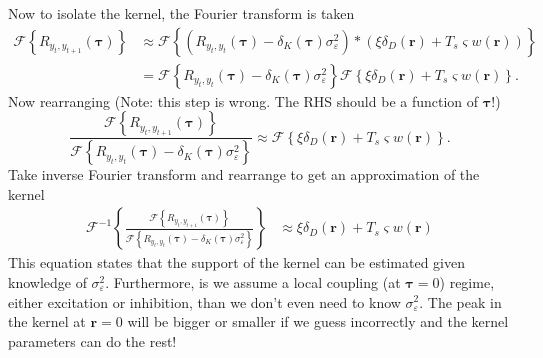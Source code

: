 \documentclass[review,authoryear,3p]{elsarticle}
\begin{document}
Now to isolate the kernel, the Fourier transform is taken
\begin{align}
	\mathcal{F}\left\{R_{y_{t},y_{t+1}}(\boldsymbol{\tau})\right\} &\approx \mathcal{F}\left\{ \left(R_{y_t,y_t}(\boldsymbol{\tau}) - \delta_K\left(\boldsymbol{\tau}\right)\sigma_{\varepsilon}^2\right) \ast \left(\xi\delta_D(\mathbf{r})  + T_s \varsigma w(\mathbf{r})\right) \right\} \\
	&= \mathcal{F}\left\{ R_{y_t,y_t}(\boldsymbol{\tau}) - \delta_K\left(\boldsymbol{\tau}\right)\sigma_{\varepsilon}^2 \right\} \mathcal{F}\left\{ \xi\delta_D(\mathbf{r})  + T_s \varsigma w(\mathbf{r}) \right\}.
\end{align}
Now rearranging (Note: this step is wrong. The RHS should be a function of $\boldsymbol\tau$!)
\begin{equation}
	\frac{\mathcal{F}\left\{R_{y_{t},y_{t+1}}(\boldsymbol{\tau})\right\}}{\mathcal{F}\left\{ R_{y_t,y_t}(\boldsymbol{\tau}) - \delta_K\left(\boldsymbol{\tau}\right)\sigma_{\varepsilon}^2 \right\}} \approx \mathcal{F}\left\{ \xi\delta_D\left(\mathbf{r}\right)  + T_s \varsigma w(\mathbf{r}) \right\}.
\end{equation}
Take inverse Fourier transform and rearrange to get an approximation of the kernel
\begin{align}
	\mathcal{F}^{-1}\left\{\frac{\mathcal{F}\left\{R_{y_{t},y_{t+1}}(\boldsymbol{\tau})\right\}}{\mathcal{F}\left\{ R_{y_t,y_t}(\boldsymbol{\tau}) - \delta_K\left(\boldsymbol{\tau}\right)\sigma_{\varepsilon}^2 \right\}}\right\} &\approx \xi\delta_D\left(\mathbf{r}\right)  + T_s \varsigma w(\mathbf{r}) %
\end{align}
This equation states that the support of the kernel can be estimated given knowledge of $\sigma_\varepsilon^2$. Furthermore, is we assume a local coupling (at $\boldsymbol\tau=0$) regime, either excitation or inhibition, than we don't even need to know $\sigma_\varepsilon^2$. The peak in the kernel at $\mathbf{r}=0$ will be bigger or smaller if we guess incorrectly and the kernel parameters can do the rest!
% 
\end{document}
